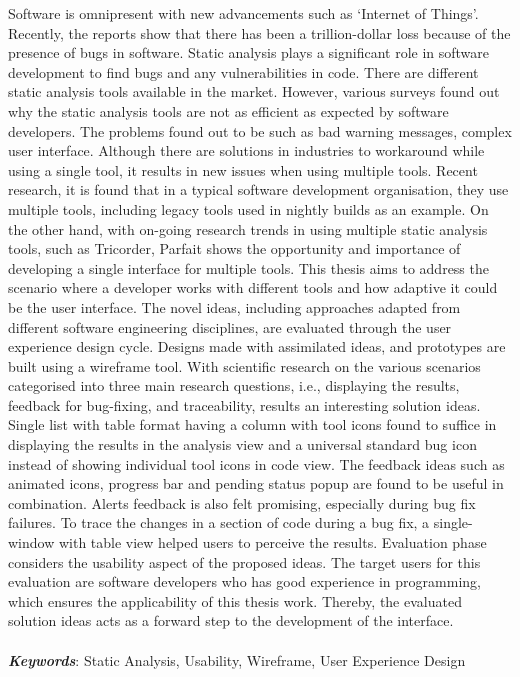 Software is omnipresent with new advancements such as ‘Internet of Things’. Recently, the reports show that there has been a trillion-dollar loss because of the presence of bugs in software. Static analysis plays a significant role in software development to find bugs and any vulnerabilities in code. There are different static analysis tools available in the market. However, various surveys found out why the static analysis tools are not as efficient as expected by software developers. The problems found out to be such as bad warning messages, complex user interface. Although there are solutions in industries to workaround while using a single tool, it results in new issues when using multiple tools. Recent research, it is found that in a typical software development organisation, they use multiple tools, including legacy tools used in nightly builds as an example. On the other hand, with on-going research trends in using multiple static analysis tools, such as Tricorder, Parfait shows the opportunity and importance of developing a single interface for multiple tools. This thesis aims to address the scenario where a developer works with different tools and how adaptive it could be the user interface. The novel ideas, including approaches adapted from different software engineering disciplines, are evaluated through the user experience design cycle. Designs made with assimilated ideas, and prototypes are built using a wireframe tool. With scientific research on the various scenarios categorised into three main research questions, i.e., displaying the results, feedback for bug-fixing, and traceability, results an interesting solution ideas. Single list with table format having a column with tool icons found to suffice in displaying the results in the analysis view and a universal standard bug icon instead of showing individual tool icons in code view. The feedback ideas such as animated icons, progress bar and pending status popup are found to be useful in combination. Alerts feedback is also felt promising, especially during bug fix failures. To trace the changes in a section of code during a bug fix, a single-window with table view helped users to perceive the results. Evaluation phase considers the usability aspect of the proposed ideas. The target users for this evaluation are software developers who has good experience in programming, which ensures the applicability of this thesis work. Thereby, the evaluated solution ideas acts as a forward step to the development of the interface. \\ \\
\textbf{\textit{Keywords}}: Static Analysis, Usability, Wireframe, User Experience Design
